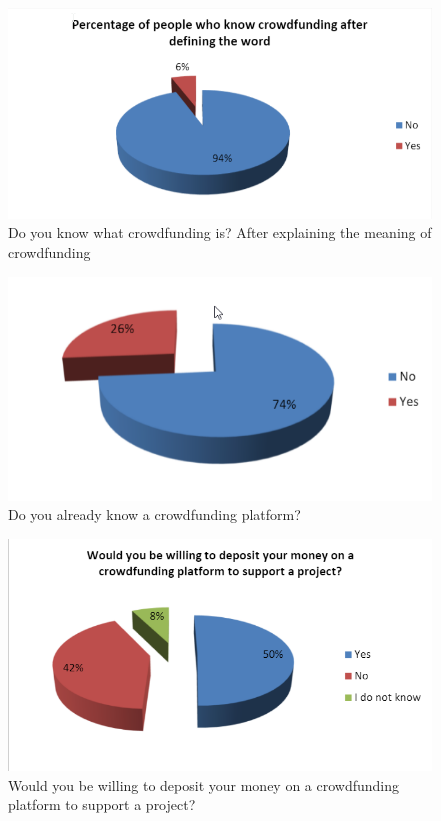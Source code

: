 \begin{figure}[!ht]
      \center
      \includegraphics[scale=0.60]{assets/knowCrowd.png}
      \caption{Do you know what crowdfunding is? After explaining the meaning of crowdfunding}
      \label{fig:knowCrowd}
\end{figure}

\begin{figure}[!ht]
      \center
      \includegraphics[scale=0.60]{assets/knowPlatform.png}
      \caption{Do you already know a crowdfunding platform?}
      \label{fig:knowPlatform}
\end{figure}

\begin{figure}[!ht]
      \center
      \includegraphics[scale=0.60]{assets/willing.png}
      \caption{Would you be willing to deposit your money on a crowdfunding platform to support a project?}
      \label{fig:willing}
\end{figure}


